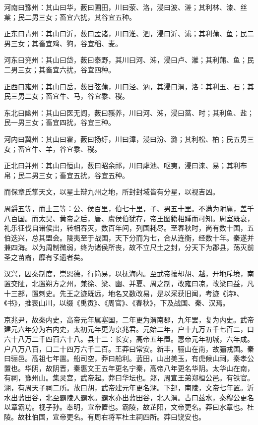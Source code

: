 \documentclass[]{article}
\begin{document}
河南曰豫州：其山曰华，薮曰圃田，川曰荥、洛，浸曰波、溠；其利林、漆、丝枲；民二男三女；畜宜六扰，其谷宜五种。

正东曰青州：其山曰沂，薮曰孟诸，川曰淮、泗，浸曰沂、沭；其利蒲、鱼；民二男三女；其畜宜鸡、狗，谷宜稻、麦。

河东曰兖州：其山曰岱，薮曰泰野，其川曰河、泲，浸曰卢、濰；其利蒲、鱼；民二男三女；其畜宜六扰，谷宜四种。

正西曰雍州；其山曰岳，薮日弦蒲，川曰泾、汭，其浸曰渭，洛：其利玉、石；其民三男二女；畜宜牛、马，谷宜黍、稷。

东北曰幽州：其山曰医无闾，薮曰豯养，川曰河、泲，浸曰菑、时；其利鱼、盐；民一男三女；畜宜四扰，谷宜三种。

河内曰冀州：其山曰霍，薮曰扬纡，川曰漳，浸曰汾、潞；其利松、柏；民五男三女；畜宜牛、羊，谷宜黍、稷。

正北曰并州：其山曰恒山，薮曰昭余祁，川曰虖池、呕夷，浸曰涞、易；其利布帛；民二男三女；畜宜五扰，谷宜五种。

而保章氏掌天文，以星土辩九州之地，所封封域皆有分星，以视吉凶。

周爵五等，而土三等：公、侯百里，伯七十里，子、男五十里。不满为附庸，盖千八百国。而太昊、黄帝之后，唐、虞侯伯犹存，帝王图籍相踵而可知。周室既衰，礼乐征伐自诸侯出，转相吞灭，数百年间，列国耗尽。至春秋时，尚有数十国，五伯迭兴，总其盟会。陵夷至于战国，天下分而为七，合从连衡，经数十年。秦遂并兼四海。以为周制微弱，终为诸侯所丧，故不立尺土之封，分天下为郡县，荡灭前圣之苗裔，靡有孓遗者矣。

汉兴，因秦制度，崇恩德，行简易，以抚海内。至武帝攘却胡、越，开地斥境，南置交阯，北置朔方之州，兼徐、梁、幽、并夏、周之制，改雍曰凉，改梁曰益，凡十三部，置刺史。先王之迹既远，地名又数改易，是以采获旧闻，考迹《诗》、《书》，推表山川，以缀《禹贡》、《周官》、《春秋》，下及战国、秦、汉焉。

京兆尹，故秦内史，高帝元年属塞国，二年更为渭南郡，九年罢，复为内史。武帝建元六年分为右内史，太初元年更为京兆君。元始二年，户十九万五千七百二，口六十八万二千四百六十八。县十二：长安，高帝五年置。惠帝元年初城，六年成。户八万八百，口二十四万六千二百。王莽曰常安。新丰，骊山在南，故骊戎国。秦曰骊邑。高祖七年置。船司空，莽曰船利。蓝田，山出美玉，有虎候山祠，秦孝公置也。华阴，故阴晋，秦惠文王五年更名宁秦，高帝八年更名华阴。太华山在南，有祠，豫州山。集灵宫，武帝起。莽曰华坛也。郑，周宣王弟郑桓公邑。有铁官。湖，有周天子祠二所。故曰胡，武帝建元年更名湖。下邽，南陵，文帝七年置。沂水出蓝田谷，北至霸陵入霸水。霸水亦出蓝田谷，北入渭。古曰兹水，秦穆公更名以章霸功。视子孙。奉明，宣帝置也。霸陵，故芷阳，文帝更名。莽曰水章也。杜陵。故杜伯国，宣帝更名。有周右将军杜主祠四所。莽曰饶安也。
\end{document}

